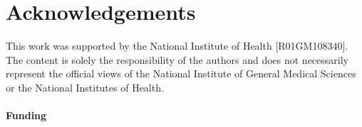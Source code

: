 \documentclass[]{bioinfo}
\begin{document}
\section*{Acknowledgements}
This work was supported by the National Institute of Health [R01GM108340].
The content is solely the responsibility of the authors and does not necessarily
represent the official views of the National Institute of General Medical Sciences
or the National Institutes of Health.
\paragraph{Funding\textcolon} 



\end{document}
